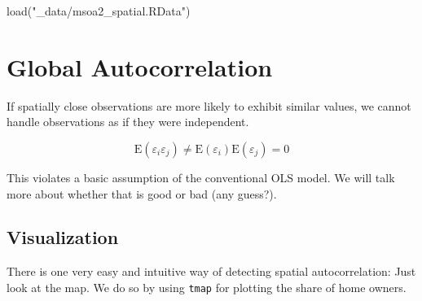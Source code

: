 \documentclass[
  letterpaper,
]{scrbook}
\newenvironment{Shaded}{\begin{snugshade}}{\end{snugshade}}
\newcommand{\FunctionTok}[1]{\textcolor[rgb]{0.28,0.35,0.67}{#1}}
\newcommand{\NormalTok}[1]{\textcolor[rgb]{0.00,0.23,0.31}{#1}}
\newcommand{\StringTok}[1]{\textcolor[rgb]{0.13,0.47,0.30}{#1}}
\begin{document}
\begin{Shaded}
\begin{Highlighting}[]
\FunctionTok{load}\NormalTok{(}\StringTok{"\_data/msoa2\_spatial.RData"}\NormalTok{)}
\end{Highlighting}
\end{Shaded}

\hypertarget{global-autocorrelation}{%
\section{Global Autocorrelation}\label{global-autocorrelation}}

If spatially close observations are more likely to exhibit similar
values, we cannot handle observations as if they were independent.

\[ 
\mathrm{E}(\varepsilon_i\varepsilon_j)\neq \mathrm{E}(\varepsilon_i)\mathrm{E}(\varepsilon_j) = 0
\]

This violates a basic assumption of the conventional OLS model. We will
talk more about whether that is good or bad (any guess?).

\hypertarget{visualization-1}{%
\subsection{Visualization}\label{visualization-1}}

There is one very easy and intuitive way of detecting spatial
autocorrelation: Just look at the map. We do so by using \texttt{tmap}
for plotting the share of home owners.
\end{document}
